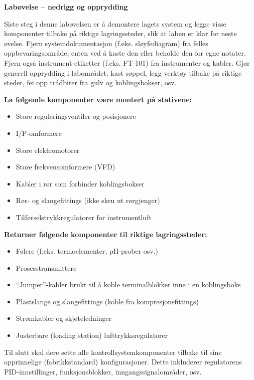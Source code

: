 \noindent
{\bf Labøvelse -- nedrigg og opprydding}

\vskip 5pt

Siste steg i denne labøvelsen er å demontere lagets system og legge visse komponenter tilbake på riktige lagringssteder, slik at laben er klar for neste øvelse.  Fjern systemdokumentasjon (f.eks. sløyfediagram) fra felles oppbevaringsområde, enten ved å kaste den eller beholde den for egne notater.  Fjern også instrument-etiketter (f.eks. FT-101) fra instrumenter og kabler.  Gjør generell opprydding i labområdet: kast søppel, legg verktøy tilbake på riktige steder, fei opp trådbiter fra gulv og koblingsbokser, osv.

\vskip 10pt

\indent
{\bf La følgende komponenter være montert på stativene:}

\begin{itemize}
\item{} Store reguleringsventiler og posisjonere
\item{} I/P-omformere
\item{} Store elektromotorer
\item{} Store frekvensomformere (VFD)
\item{} Kabler i rør som forbinder koblingsbokser
\item{} Rør- og slangefittings (ikke skru ut rørgjenger)
\item{} Tilførselstrykkregulatorer for instrumentluft
\end{itemize}

\vskip 10pt

\indent
{\bf Returner følgende komponenter til riktige lagringssteder:}

\begin{itemize}
\item{} Følere (f.eks. termoelementer, pH-prober osv.)
\item{} Prosesstransmittere
\item{} ``Jumper''-kabler brukt til å koble terminalblokker inne i en koblingsboks
\item{} Plastslange og slangefittings (koble fra kompresjonsfittings)
\item{} Strømkabler og skjøteledninger
\item{} Justerbare (loading station) lufttrykksregulatorer
\end{itemize}

\vskip 10pt

Til slutt skal dere sette alle kontrollsystemkomponenter tilbake til sine opprinnelige (fabrikkstandard) konfigurasjoner.  Dette inkluderer regulatorens PID-innstillinger, funksjonsblokker, inngangssignalområder, osv.





